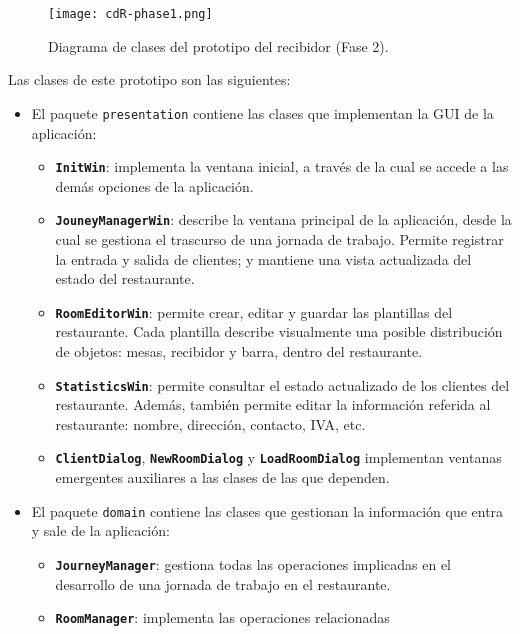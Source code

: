   \begin{sidewaysfigure}[hp]
    \begin{center}
      \texttt{[image: cdR-phase1.png]}
      \caption{Diagrama de clases del prototipo del recibidor (Fase 2).}
      \label{fig:cdR-phase1}
    \end{center}
  \end{sidewaysfigure}

Las clases de este prototipo son las siguientes:
\begin{itemize}
\item El paquete \texttt{presentation} contiene las clases que implementan
la \acs{GUI} de la aplicación:
  \begin{itemize}
  \item \textbf{\texttt{InitWin}}: implementa la ventana inicial, a través de 
  la cual se accede a las demás opciones de la aplicación.
  \item \textbf{\texttt{JouneyManagerWin}}: describe la ventana principal de la
  aplicación, desde la cual se gestiona el trascurso de una jornada de trabajo.
  Permite registrar la entrada y salida de clientes; y mantiene una vista
  actualizada del estado del restaurante.
  \item \textbf{\texttt{RoomEditorWin}}: permite crear, editar y guardar las
  plantillas del restaurante. Cada plantilla describe visualmente una posible
  distribución de objetos: mesas, recibidor y barra, dentro del restaurante.
  \item \textbf{\texttt{StatisticsWin}}: permite consultar el estado 
  actualizado de los clientes del restaurante. Además, también permite editar   
  la información referida al restaurante: nombre, dirección, contacto, IVA,
  etc.
  \item \textbf{\texttt{ClientDialog}}, \textbf{\texttt{NewRoomDialog}} y
  \textbf{\texttt{LoadRoomDialog}} implementan ventanas emergentes auxiliares a 
  las clases de las que dependen.
  \end{itemize}
\item El paquete \texttt{domain} contiene las clases que gestionan la 
información que entra y sale de la aplicación:
  \begin{itemize}
  \item \textbf{\texttt{JourneyManager}}: gestiona todas las operaciones 
  implicadas en el desarrollo de una jornada de trabajo en el restaurante.
  \item \textbf{\texttt{RoomManager}}: implementa las operaciones relacionadas 

\end{itemize}
\end{itemize}
